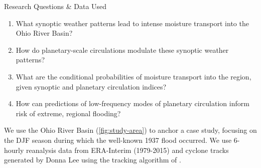 \begin{block}{Research Questions \& Data Used}
    \begin{enumerate}
        \item What synoptic weather patterns lead to intense moisture transport into the Ohio River Basin?
        \item How do planetary-scale circulations modulate these synoptic weather patterns?
        \item What are the conditional probabilities of moisture transport into the region, given synoptic and planetary circulation indices?
        \item How can predictions of low-frequency modes of planetary circulation inform risk of extreme, regional flooding?
    \end{enumerate}
    We use the Ohio River Basin (\cref{fig:study-area}) to anchor a case study, focusing on the DJF season during which the well-known 1937 flood occurred.
    We use 6-hourly reanalysis data from ERA-Interim \cite{Dee2011} (1979-2015) and cyclone tracks generated by Donna Lee \cite{Booth2015} using the tracking algorithm of \cite{Hodges1994}.
\end{block}
